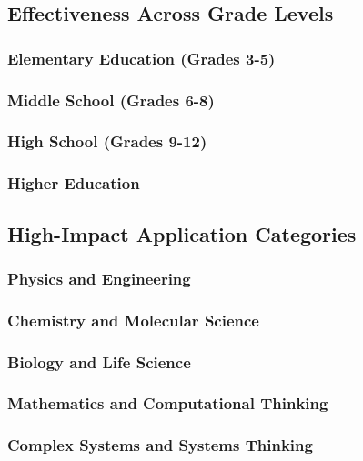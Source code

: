 \subsection{Effectiveness Across Grade Levels}

\subsubsection{Elementary Education (Grades 3-5)}

\subsubsection{Middle School (Grades 6-8)}

\subsubsection{High School (Grades 9-12)}

\subsubsection{Higher Education}

\subsection{High-Impact Application Categories}

\subsubsection{Physics and Engineering}

\subsubsection{Chemistry and Molecular Science}

\subsubsection{Biology and Life Science}

\subsubsection{Mathematics and Computational Thinking}

\subsubsection{Complex Systems and Systems Thinking}

